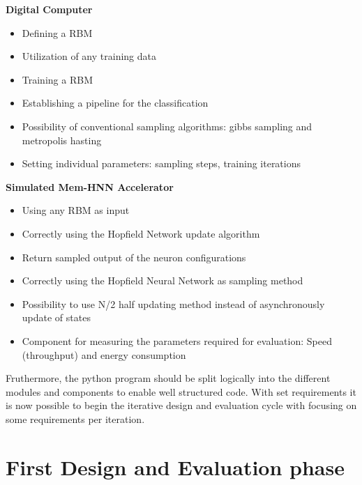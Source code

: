 \textbf{Digital Computer}
\begin{itemize}
    \item Defining a \ac{RBM}
    \item Utilization of any training data
    \item Training a \ac{RBM}
    \item Establishing a pipeline for the classification
    \item Possibility of conventional sampling algorithms: gibbs sampling and metropolis hasting
    \item Setting individual parameters: sampling steps, training iterations 
\end{itemize}
\textbf{Simulated Mem-HNN Accelerator}
\begin{itemize}
    \item Using any \ac{RBM} as input
    \item Correctly using the Hopfield Network update algorithm
    \item Return sampled output of the neuron configurations 
    \item Correctly using the Hopfield Neural Network as sampling method 
    \item Possibility to use N/2 half updating method instead of asynchronously update of states
    \item Component for measuring the parameters required for evaluation: Speed (throughput) and energy consumption
\end{itemize}
Fruthermore, the python program should be split logically into the different modules and components to enable well structured code. 
With set requirements it is now possible to begin the iterative design and evaluation cycle with focusing on some requirements per iteration.

\section{First Design and Evaluation phase}

